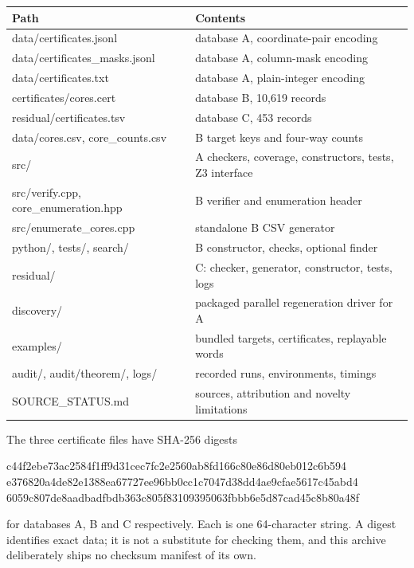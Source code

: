 \documentclass[11pt,letterpaper]{article}
\numberwithin{equation}{section}
\theoremstyle{definition}
\theoremstyle{remark}
\newcommand{\dbA}{\textsf{A}}
\newcommand{\dbB}{\textsf{B}}
\newcommand{\dbC}{\textsf{C}}
\begin{document}
\begin{center}
\footnotesize
\begin{tabular}{@{}>{\ttfamily}l l@{}}
\toprule
\textrm{Path} & Contents\\
\midrule
data/certificates.jsonl & database \dbA{}, coordinate-pair encoding\\
data/certificates\_masks.jsonl & database \dbA{}, column-mask encoding\\
data/certificates.txt & database \dbA{}, plain-integer encoding\\
certificates/cores.cert & database \dbB{}, 10,619 records\\
residual/certificates.tsv & database \dbC{}, 453 records\\
data/cores.csv, core\_counts.csv & \dbB{} target keys and four-way counts\\
src/ & \dbA{} checkers, coverage, constructors, tests, Z3 interface\\
src/verify.cpp, core\_enumeration.hpp & \dbB{} verifier and enumeration header\\
src/enumerate\_cores.cpp & standalone \dbB{} CSV generator\\
python/, tests/, search/ & \dbB{} constructor, checks, optional finder\\
residual/ & \dbC{}: checker, generator, constructor, tests, logs\\
discovery/ & packaged parallel regeneration driver for \dbA{}\\
examples/ & bundled targets, certificates, replayable words\\
audit/, audit/theorem/, logs/ & recorded runs, environments, timings\\
SOURCE\_STATUS.md & sources, attribution and novelty limitations\\
\bottomrule
\end{tabular}
\end{center}

\begin{samepage}
The three certificate files have SHA-256 digests
\begin{center}\small\ttfamily
c44f2ebe73ac2584f1ff9d31cec7fc2e2560ab8fd166c80e86d80eb012c6b594\\
e376820a4de82e1388ea67727ee96bb0cc1c7047d38dd4ae9cfae5617c45abd4\\
6059c807de8aadbadfbdb363c805f83109395063fbbb6e5d87cad45c8b80a48f
\end{center}
\end{samepage}
for databases \dbA{}, \dbB{} and \dbC{} respectively. Each is one
64-character string. A digest identifies exact data; it is not a substitute
for checking them, and this archive deliberately ships no checksum manifest
of its own.
\end{document}

